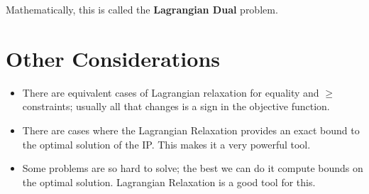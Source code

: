 \documentclass[11pt]{article}
\theoremstyle{definition}
\begin{document}
\vspace{2cm}

Mathematically, this is called the \textbf{Lagrangian Dual} problem.

\vfill

\section{Other Considerations}

\begin{itemize}
\item There are equivalent cases of Lagrangian relaxation for equality and $\geq$ constraints; usually all that changes is a sign in the objective function.
\item There are cases where the Lagrangian Relaxation provides an exact bound to the optimal solution of the IP. This makes it a very powerful tool.
\item Some problems are so hard to solve; the best we can do it compute bounds on the optimal solution. Lagrangian Relaxation is a good tool for this.
\end{itemize}

\end{document}
